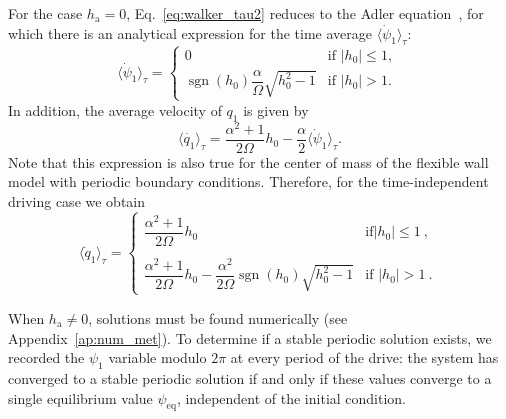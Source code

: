 \documentclass[prb,aps,twocolumn,superscriptaddress,floatfix]{revtex4-1}
\newcommand{\aleadd}[1]{{\color{blue}#1}}
\begin{document}
For the case $h_\text{a}=0$, Eq.~\eqref{eq:walker_tau2} reduces to the Adler equation~\cite{adler1946study}, for which there is an analytical expression for the time average $\langle\dot\psi_1\rangle_\tau$:
%
\begin{equation}
    \langle\dot \psi_1 \rangle_\tau  = \begin{cases} 
0 & \text{if } \left| h_0\right| \leq 1, \\ 
\operatorname{sgn}(h_0)\dfrac \alpha \Omega \sqrt{h_0^2 - 1} & \text{if }\left| h_0\right| >1.
\end{cases}\
    \label{eq:avg_walker}
\end{equation}
%
In addition, the average velocity of $q_{1}$ is given by
%
\begin{equation}
    \langle \dot{q_{1}} \rangle_{\tau} = \frac{\alpha^{2}+1}{2\Omega}h_{0} - \frac{\alpha}{2}\langle\dot \psi_1\rangle_{\tau}.
    \label{eq:dot_q1_avg}
\end{equation}
%
Note that this expression is also true for the \aleadd{center of mass of the} flexible wall model with periodic boundary conditions. Therefore, for the time-independent driving case we obtain
%
\begin{equation}
    \langle\dot q_1 \rangle_\tau  =
    \begin{cases} 
     \dfrac{\alpha^{2}+1}{2\Omega}h_{0} & \text{if} \left| h_0\right| \leq 1 \ , \\ \\
    \dfrac{\alpha^{2}+1}{2\Omega}h_{0}-\dfrac{\alpha^{2}}{2\Omega}\operatorname{sgn}(h_0) \sqrt{h_0^2 - 1} & \text{if }\left| h_0\right| >1 \ .
    \end{cases}\
    \label{eq:avg_q1_cases}
\end{equation}
%

When $h_\text{a}\neq0$, solutions must be found numerically (see Appendix~\ref{ap:num_met}). To determine if a stable periodic solution exists, we recorded the $\psi_1$ variable modulo $2\pi$ at every period of the drive: the system has converged to a stable periodic solution if and only if these values converge to a single equilibrium value $\psi_\text{eq}$, independent of the initial condition.
\end{document}
